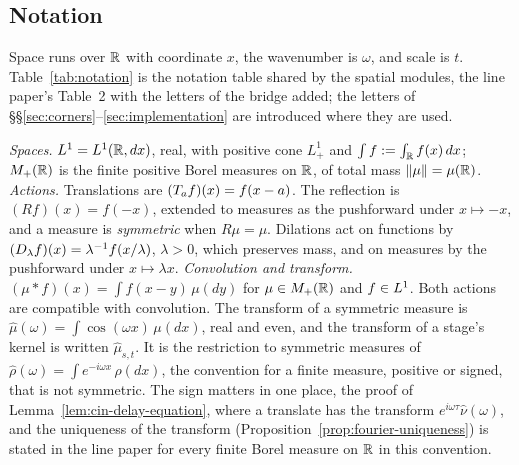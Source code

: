 \subsection{Notation}\label{sec:notation}

Space runs over $\mathbb{R}$ with coordinate $x$, the wavenumber is $\omega$, and scale is $t$.
Table~\ref{tab:notation} is the notation table shared by the spatial modules, the line paper's
Table~2 with the
letters of the bridge added; the letters of \S\S\ref{sec:corners}--\ref{sec:implementation}
are introduced where they are used.

\emph{Spaces.} $L^1 = L^1(\mathbb{R}, dx)$, real, with positive cone $L^1_+$ and
$\int f := \int_{\mathbb{R}} f(x)\,dx$; $M_+(\mathbb{R})$ is the finite positive Borel measures on $\mathbb{R}$, of
total mass $\|\mu\| = \mu(\mathbb{R})$. \emph{Actions.} Translations are $(T_{a} f)(x) = f(x-a)$.
The reflection is $(Rf)(x) = f(-x)$, extended to measures as the pushforward under
$x \mapsto -x$, and a measure is \emph{symmetric} when $R\mu = \mu$. Dilations act on
functions by $(D_{\lambda} f)(x) = \lambda^{-1} f(x/\lambda)$, $\lambda > 0$, which
preserves mass, and on measures by the pushforward under $x \mapsto \lambda x$.
\emph{Convolution and transform.} $(\mu * f)(x) = \int f(x-y)\,\mu(dy)$ for $\mu \in M_+(\mathbb{R})$
and $f \in L^1$. Both actions are compatible with convolution. The transform of a symmetric
measure is $\hat\mu(\omega) = \int \cos(\omega x)\,\mu(dx)$, real and even, and the transform
of a stage's kernel is written $\hat\mu_{s,t}$. It is the restriction to symmetric measures of
$\hat\rho(\omega) = \int e^{-i\omega x}\,\rho(dx)$, the convention for a finite measure, positive
or signed, that is not symmetric. The sign matters in one place, the proof of
Lemma~\ref{lem:cin-delay-equation}, where a translate has the transform
$e^{i\omega\tau}\hat\nu(\omega)$, and the uniqueness of the transform
(Proposition~\ref{prop:fourier-uniqueness}) is stated in the line paper for every finite Borel
measure on $\mathbb{R}$ in this convention.

